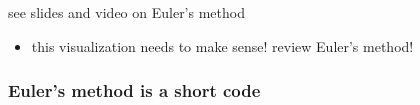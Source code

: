 \documentclass[urlcolor=blue,dvipsnames]{beamer}
\begin{document}
\begin{frame}{see slides and video on Euler's method}
\begin{itemize}
    \begin{itemize}
    \item this visualization needs to make sense! review Euler's method!
    \end{itemize}
\end{itemize}
\end{frame}


\begin{frame}[fragile]
\frametitle{Euler's method is a short code}

\bigskip
{}
\end{frame}

\end{document}

